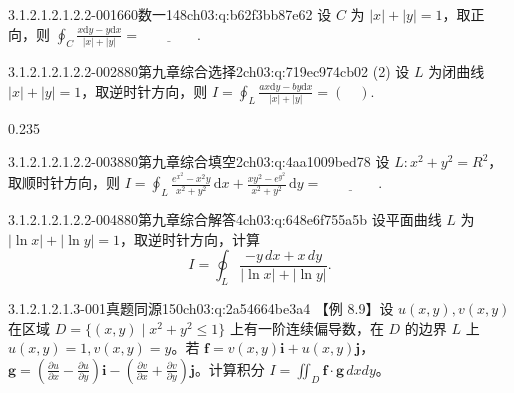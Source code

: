 \par\addvspace{2.4ex}\noindent
\begin{minipage}{\linewidth}

\begin{q}{3.1.2.1.2.1.2.2-001}{660数一148}{ch03:q:b62f3bb87e62}
设 $C$ 为 $|x|+|y|=1$，取正向，则 $\displaystyle \oint_{C}\frac{x\mathrm{d}y-y\mathrm{d}x}{|x|+|y|}=\underline{\hspace{4em}}.$
\end{q}
\end{minipage}


\begin{q}{3.1.2.1.2.1.2.2-002}{880第九章综合选择2}{ch03:q:719ec974cb02}
(2) 设 $L$ 为闭曲线 $|x|+|y|=1$，取逆时针方向，则 $\displaystyle I=\oint_{L}\frac{ax\mathrm{d}y-by\mathrm{d}x}{|x|+|y|}=(\quad)$.
\begin{opts}{0.235}
\hfill{}\hfill{}\hfill{}
\end{opts}
\end{q}

\begin{q}{3.1.2.1.2.1.2.2-003}{880第九章综合填空2}{ch03:q:4aa1009bed78}
设 $L:x^2+y^2=R^2$，取顺时针方向，则
$\displaystyle I=\oint_L \frac{e^{x^2}-x^2y}{x^2+y^2}\,\mathrm{d}x+\frac{xy^2-e^{y^2}}{x^2+y^2}\,\mathrm{d}y=\underline{\hspace{4em}}.$
\end{q}

\begin{q}{3.1.2.1.2.1.2.2-004}{880第九章综合解答4}{ch03:q:648e6f755a5b}
设平面曲线 $L$ 为 $|\ln x|+|\ln y|=1$，取逆时针方向，计算
\[
I=\oint_L \frac{-y\,dx+x\,dy}{|\ln x|+|\ln y|}.
\]
\end{q}

\par\addvspace{2.4ex}\noindent
\begin{minipage}{\linewidth}

\begin{q}{3.1.2.1.2.1.3-001}{真题同源150}{ch03:q:2a54664be3a4}
【例 8.9】设 $u(x,y),v(x,y)$ 在区域 $D=\{(x,y)\mid x^2+y^2\le 1\}$ 上有一阶连续偏导数，在 $D$ 的边界 $L$ 上 $u(x,y)=1,v(x,y)=y$。若 $\boldsymbol{f}=v(x,y)\boldsymbol{i}+u(x,y)\boldsymbol{j}$，$\boldsymbol{g}=\left(\frac{\partial u}{\partial x}-\frac{\partial u}{\partial y}\right)\boldsymbol{i}-\left(\frac{\partial v}{\partial x}+\frac{\partial v}{\partial y}\right)\boldsymbol{j}$。计算积分 $\displaystyle I=\iint_D \boldsymbol{f}\cdot\boldsymbol{g}\,dxdy$。
\end{q}
\end{minipage}


